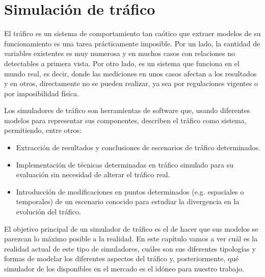 \chapter{Simulación de tráfico}
\label{ch:sota-traffic-simulation}


El tráfico es un sistema de comportamiento tan caótico que extraer modelos de su funcionamiento es una tarea prácticamente imposible. Por un lado, la cantidad de variables existentes es muy numerosa y en muchos casos con relaciones no detectables a primera vista. Por otro lado, es un sistema que funciona en el mundo real, es decir, donde las mediciones en unos casos afectan a los resultados y en otros, directamente no se pueden realizar, ya sea por regulaciones vigentes o por imposibilidad física.

Los simuladores de tráfico son herramientas de software que, usando diferentes modelos para representar sus componentes, describen el tráfico como sistema, permitiendo, entre otros:

\begin{itemize}
	\item Extracción de resultados y conclusiones de escenarios de tráfico determinados.
	\item Implementación de técnicas determinadas en tráfico simulado para su evaluación sin necesidad de alterar el tráfico real.
	\item Introducción de modificaciones en puntos determinados (e.g. espaciales o temporales) de un escenario conocido para estudiar la divergencia en la evolución del tráfico.
\end{itemize}

El objetivo principal de un simulador de tráfico es el de hacer que sus modelos se parezcan lo máximo posible a la realidad. En este capítulo vamos a ver cuál es la realidad actual de este tipo de simuladores, cuáles son sus diferentes tipologías y formas de modelar los diferentes aspectos del tráfico y, posteriormente, qué simulador de los disponibles en el mercado es el idóneo para nuestro trabajo.

